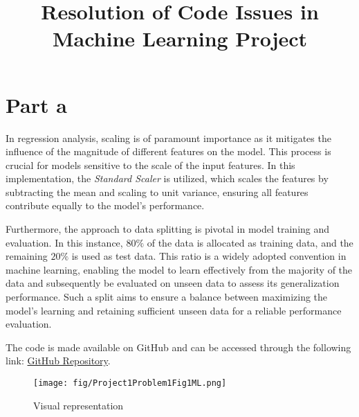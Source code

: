 \documentclass{article}
\begin{document}
\title{Resolution of Code Issues in Machine Learning Project}
\author{}
\date{}
\maketitle

\section*{Part a}

In regression analysis, scaling is of paramount importance as it mitigates the influence of the magnitude of different features on the model. This process is crucial for models sensitive to the scale of the input features. In this implementation, the \textit{Standard Scaler} is utilized, which scales the features by subtracting the mean and scaling to unit variance, ensuring all features contribute equally to the model's performance.

Furthermore, the approach to data splitting is pivotal in model training and evaluation. In this instance, $80\%$ of the data is allocated as training data, and the remaining $20\%$ is used as test data. This ratio is a widely adopted convention in machine learning, enabling the model to learn effectively from the majority of the data and subsequently be evaluated on unseen data to assess its generalization performance. Such a split aims to ensure a balance between maximizing the model's learning and retaining sufficient unseen data for a reliable performance evaluation.

The code is made available on GitHub and can be accessed through the following link: \href{https://github.com/SheikAbdullahi/MachineLearning}{GitHub Repository}.

\begin{figure}[htbp]
    \centering
    \texttt{[image: fig/Project1Problem1Fig1ML.png]}
    \caption{Visual representation}
    \label{fig:python-code}
\end{figure}
\end{document}
